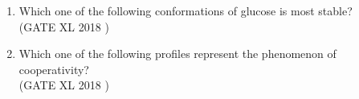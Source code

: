 \documentclass[14pt]{extarticle}
\begin{document}
\begin{flushleft}
\begin{enumerate}[leftmargin=*]
\item Which one of the following conformations of glucose is most stable?\\
\hfill(GATE XL 2018 )\\
\begin{enumerate}[label=(\Alph*)]
\end{enumerate}

\item Which one of the following profiles represent the phenomenon of cooperativity?\\
\hfill(GATE XL 2018 )\\
\begin{enumerate}[label=(\Alph*)]
\end{enumerate}


\end{enumerate}
\end{flushleft}
\end{document}
